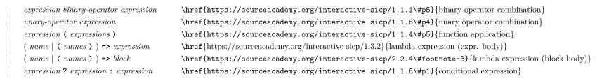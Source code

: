 \begin{alignat*}{9}
&&                       && |   &\quad &&  \textit{expression} \  \textit{binary-operator} \ 
                                            \textit{expression} \qquad
                                                           && \textrm{\href{https://sourceacademy.org/interactive-sicp/1.1.1\#p5}{binary operator combination}}\\
&&                       && |   &\quad &&   \textit{unary-operator} \ 
                                            \textit{expression}
                                                           && \textrm{\href{https://sourceacademy.org/interactive-sicp/1.1.6\#p4}{unary operator combination}}\\
&&                       && |   &\quad &&   \textit{expression} \ 
                                            \textbf{\texttt{(}}\ \textit{expressions}\
                                            \textbf{\texttt{)}}
                                                           && \textrm{\href{https://sourceacademy.org/interactive-sicp/1.1.4\#p5}{function application}}\\
&&                       && |   &\quad &&   (\ \textit{name}\ | \
                                               \textbf{\texttt{(}}\ \textit{names}\ \textbf{\texttt{)}}\
                                            )\    
                                            \texttt{\textbf{=>}}\ \textit{expression}
                                                           && \textrm{\href{https://sourceacademy.org/interactive-sicp/1.3.2}{lambda expression (expr. body)}}\\
&&                       && |   &\quad &&   (\ \textit{name}\ | \
                                               \textbf{\texttt{(}}\ \textit{names}\ \textbf{\texttt{)}}\
                                            )\    
                                            \texttt{\textbf{=>}}\ \textit{block}
                                                           && \textrm{\href{https://sourceacademy.org/interactive-sicp/2.2.4\#footnote-3}{lambda expression (block body)}}\\
&&                       && |   &\quad &&   \textit{expression} \ \textbf{\texttt{?}}\ 
                                            \textit{expression}
                                            \ \textbf{\texttt{:}}\
                                            \textit{expression}\
                                                           && \textrm{\href{https://sourceacademy.org/interactive-sicp/1.1.6\#p1}{conditional expression}}\\

\end{alignat*}
